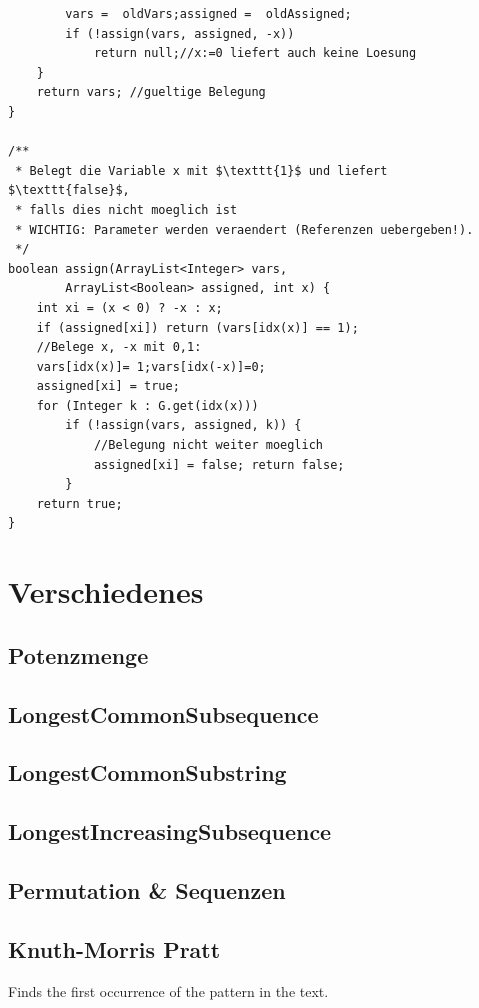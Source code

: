\documentclass[10pt,a4paper,ngerman,oneside,]{article}
\begin{document}
\begin{multicols}{2}
\begin{lstlisting}
		vars =  oldVars;assigned =  oldAssigned;
		if (!assign(vars, assigned, -x)) 
			return null;//x:=0 liefert auch keine Loesung
	}
	return vars; //gueltige Belegung
}

/**
 * Belegt die Variable x mit $\texttt{1}$ und liefert $\texttt{false}$, 
 * falls dies nicht moeglich ist
 * WICHTIG: Parameter werden veraendert (Referenzen uebergeben!). 
 */
boolean assign(ArrayList<Integer> vars,
		ArrayList<Boolean> assigned, int x) {
	int xi = (x < 0) ? -x : x;
	if (assigned[xi]) return (vars[idx(x)] == 1);
	//Belege x, -x mit 0,1:
	vars[idx(x)]= 1;vars[idx(-x)]=0;
	assigned[xi] = true;
	for (Integer k : G.get(idx(x))) 
		if (!assign(vars, assigned, k)) {
			//Belegung nicht weiter moeglich
			assigned[xi] = false; return false; 
		}
	return true;
}
\end{lstlisting}
\section{Verschiedenes}
\subsection{Potenzmenge}

\subsection{LongestCommonSubsequence}

\subsection{LongestCommonSubstring}

\subsection{LongestIncreasingSubsequence}

\subsection{Permutation \& Sequenzen}

\subsection{Knuth-Morris Pratt}
Finds the first occurrence of the pattern in the text.

\end{multicols}
\end{document}
